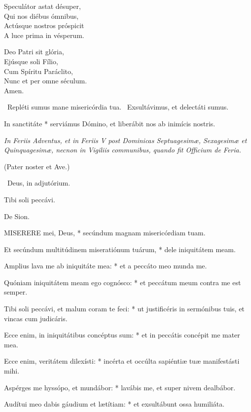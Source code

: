 Speculátor astat désuper,\\
Qui nos diébus ómnibus,\\
Actúsque nostros próspicit\\
A luce prima in vésperum.

Deo Patri sit glória,\\
Ejúsque soli Fílio,\\
Cum Spíritu Paráclito,\\
Nunc et per omne séculum.\\
Amen.

\V\ Repléti sumus mane misericórdia tua. \R\ Exsultávimus, et delectáti sumus.

 In sanctitáte * serviámus Dómino, et liberábit nos ab inimícis nostris.


\sectionornament


\textit{In Feriis Adventus, et in Feriis V post Dominicas Septuagesimæ, Sexagesimæ et Quinquagesimæ, necnon in Vigiliis communibus, quando fit Officium de Feria.}

(Pater noster et Ave.)

\V\ Deus, in adjutórium.

 Tibi soli peccávi.

  De Sion.


\lettrine[lines=2]{M}{ISERERE} mei, Deus, * secúndum magnam misericórdiam tuam.

Et secúndum multitúdinem miseratiónum tuárum, * dele iniquitátem meam.

Amplius lava me ab iniquitáte mea: * et a peccáto meo munda me.

Quóniam iniquitátem meam ego cognósco: * et peccátum meum contra me est semper.

Tibi soli peccávi, et malum coram te feci: * ut justificéris in sermónibus tuis, et vincas cum judicáris.

Ecce enim, in iniquitátibus concéptus sum: * et in peccátis concépit me mater mea.

Ecce enim, veritátem dilexísti: * incérta et occúlta sapiéntiæ tuæ manifestásti mihi.

Aspérges me hyssópo, et mundábor: * lavábis me, et super nivem dealbábor.

Audítui meo dabis gáudium et lætítiam: * et exsultábunt ossa humiliáta.

